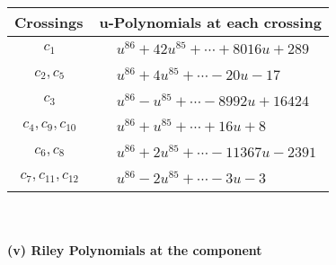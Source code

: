\documentclass[1p]{elsarticle_modified}
\theoremstyle{definition}
\begin{document}
\begin{tabular}{m{50pt}|m{274pt}}
Crossings & \hspace{64pt}u-Polynomials at each crossing \\
\hline $$\begin{aligned}c_{1}\end{aligned}$$&$\begin{aligned}
&u^{86}+42 u^{85}+\cdots+8016 u+289
\end{aligned}$\\
\hline $$\begin{aligned}c_{2},c_{5}\end{aligned}$$&$\begin{aligned}
&u^{86}+4 u^{85}+\cdots-20 u-17
\end{aligned}$\\
\hline $$\begin{aligned}c_{3}\end{aligned}$$&$\begin{aligned}
&u^{86}- u^{85}+\cdots-8992 u+16424
\end{aligned}$\\
\hline $$\begin{aligned}c_{4},c_{9},c_{10}\end{aligned}$$&$\begin{aligned}
&u^{86}+u^{85}+\cdots+16 u+8
\end{aligned}$\\
\hline $$\begin{aligned}c_{6},c_{8}\end{aligned}$$&$\begin{aligned}
&u^{86}+2 u^{85}+\cdots-11367 u-2391
\end{aligned}$\\
\hline $$\begin{aligned}c_{7},c_{11},c_{12}\end{aligned}$$&$\begin{aligned}
&u^{86}-2 u^{85}+\cdots-3 u-3
\end{aligned}$\\
\hline
\end{tabular}\\~\\
\newpage\renewcommand{\arraystretch}{1}
\flushleft \textbf{(v) Riley Polynomials at the component}\newline \\
\end{document}
